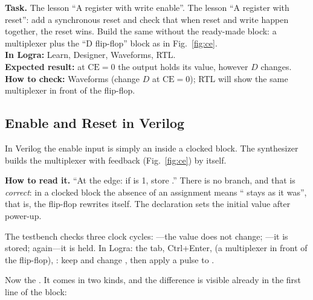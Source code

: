 \begin{diybox}
\textbf{Task.}  The lesson ``A register with write enable''. 
The lesson ``A register with reset'': add a synchronous reset and check that
when reset and write happen together, the reset wins.  Build the same
without the ready-made block: a multiplexer plus the ``D flip-flop'' block as in
Fig.~\ref{fig:ce}.\\
\textbf{In Logra:} Learn, Designer, Waveforms, RTL.\\
\textbf{Expected result:} at $\text{CE}=0$ the output holds its value, however
$D$ changes.\\
\textbf{How to check:} Waveforms (change $D$ at $\text{CE}=0$); RTL
will show the same multiplexer in front of the flip-flop.
\end{diybox}

\subsection{Enable and Reset in Verilog}
\label{sec:ff-en-rst-v}

In Verilog the enable input is simply an  inside a clocked block. The
synthesizer builds the multiplexer with feedback (Fig.~\ref{fig:ce}) by itself.


\textbf{How to read it.} ``At the edge: if  is 1, store .''
There is no  branch, and that is \emph{correct}: in a clocked block
the absence of an assignment means `` stays as it was'', that is, the
flip-flop rewrites itself. The declaration  sets the
initial value after power-up.

The testbench  checks three clock cycles: ---the
value does not change; ---it is stored;  again---it is
held. In Logra: the  tab, Ctrl+Enter,  (a multiplexer in
front of the flip-flop), : keep  and change ,
then apply a pulse to .

Now the . It comes in two kinds, and the difference is visible
already in the first line of the block:



